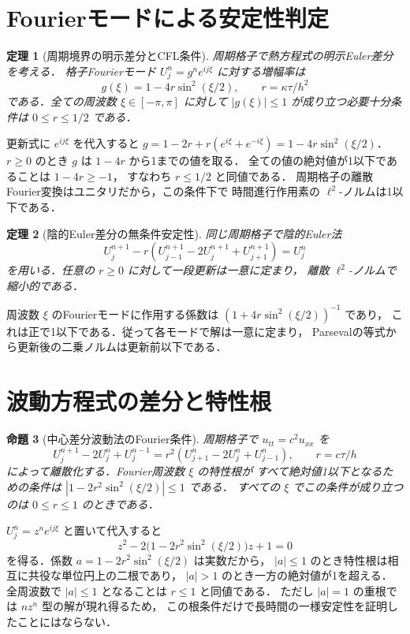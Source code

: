 \documentclass[a5paper,10pt,onecolumn]{jsarticle}
\makeatletter
\theoremstyle{mathnotetheorem}
\newtheorem{theorem}{定理}[section]
\newtheorem{proposition}[theorem]{命題}
\renewcommand{\proofname}{証明}
\renewenvironment{proof}[1][\proofname]{%
  \par\pushQED{\qed}\normalfont\topsep4\p@\@plus2\p@\relax
  \trivlist\item[\hskip\labelsep\bfseries #1]\ignorespaces
}{\popQED\endtrivlist\@endpefalse}
\makeatother
\begin{document}
\section{Fourierモードによる安定性判定}
\begin{theorem}[周期境界の明示差分とCFL条件]
周期格子で熱方程式の明示Euler差分を考える．
格子Fourierモード $U_j^n=g^ne^{ij\xi}$ に対する増幅率は
\[
 g(\xi)=1-4r\sin^2(\xi/2),\qquad r=\kappa\tau/h^2
\]
である．全ての周波数 $\xi\in[-\pi,\pi]$ に対して
$|g(\xi)|\le1$ が成り立つ必要十分条件は $0\le r\le1/2$ である．
\end{theorem}
\begin{proof}
更新式に $e^{ij\xi}$ を代入すると
$g=1-2r+r(e^{i\xi}+e^{-i\xi})=1-4r\sin^2(\xi/2)$．
$r\ge0$ のとき $g$ は $1-4r$ から1までの値を取る．
全ての値の絶対値が1以下であることは $1-4r\ge-1$，
すなわち $r\le1/2$ と同値である．
周期格子の離散Fourier変換はユニタリだから，この条件下で
時間進行作用素の $\ell^2$-ノルムは1以下である．
\end{proof}
\begin{theorem}[陰的Euler差分の無条件安定性]
同じ周期格子で陰的Euler法
\[
 U_j^{n+1}-r(U_{j-1}^{n+1}-2U_j^{n+1}+U_{j+1}^{n+1})=U_j^n
\]
を用いる．任意の $r\ge0$ に対して一段更新は一意に定まり，
離散 $\ell^2$-ノルムで縮小的である．
\end{theorem}
\begin{proof}
周波数 $\xi$ のFourierモードに作用する係数は
$(1+4r\sin^2(\xi/2))^{-1}$ であり，
これは正で1以下である．従って各モードで解は一意に定まり，
Parsevalの等式から更新後の二乗ノルムは更新前以下である．
\end{proof}
\section{波動方程式の差分と特性根}
\begin{proposition}[中心差分波動法のFourier条件]
周期格子で $u_{tt}=c^2u_{xx}$ を
\[
 U_j^{n+1}-2U_j^n+U_j^{n-1}
 =r^2(U_{j+1}^n-2U_j^n+U_{j-1}^n),\qquad r=c\tau/h
\]
によって離散化する．Fourier周波数 $\xi$ の特性根が
すべて絶対値1以下となるための条件は
$|1-2r^2\sin^2(\xi/2)|\le1$ である．
すべての $\xi$ でこの条件が成り立つのは $0\le r\le1$ のときである．
\end{proposition}
\begin{proof}
$U_j^n=z^ne^{ij\xi}$ と置いて代入すると
\[
 z^2-2\bigl(1-2r^2\sin^2(\xi/2)\bigr)z+1=0
\]
を得る．係数 $a=1-2r^2\sin^2(\xi/2)$ は実数だから，
$|a|\le1$ のとき特性根は相互に共役な単位円上の二根であり，
$|a|>1$ のとき一方の絶対値が1を超える．
全周波数で $|a|\le1$ となることは $r\le1$ と同値である．
ただし $|a|=1$ の重根では $n z^n$ 型の解が現れ得るため，
この根条件だけで長時間の一様安定性を証明したことにはならない．
\end{proof}
\end{document}
